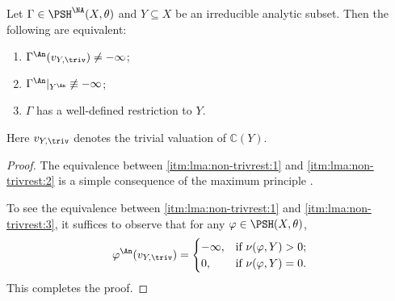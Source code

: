 \begin{lemma}\label{lma:non-trivrest}
    Let $\Gamma\in \PSH^{\NA}(X,\theta)$ and $Y\subseteq X$ be an irreducible analytic subset. Then the following are equivalent:
    \begin{enumerate}
    \item\label{itm:lma:non-trivrest:1} $\Gamma^{\An}(v_{Y,\triv})\neq -\infty$;
    \item\label{itm:lma:non-trivrest:2} $\Gamma^{\An}|_{Y^{\An}}\not\equiv -\infty$;
    \item\label{itm:lma:non-trivrest:3} $\Gamma$ has a well-defined restriction to $Y$.
\end{enumerate}
\end{lemma}
Here $v_{Y,\triv}$ denotes the trivial valuation of $\mathbb{C}(Y)$.

\begin{proof}
The equivalence between \ref{itm:lma:non-trivrest:1} and \ref{itm:lma:non-trivrest:2} is a simple consequence of the maximum principle \cite[Lemma~1.4(i)]{BJ22}.

To see the equivalence between \ref{itm:lma:non-trivrest:1} and \ref{itm:lma:non-trivrest:3}, it suffices to observe that for any $\varphi\in \PSH(X,\theta)$,
\[
\varphi^{\An}(v_{Y,\triv})=
\begin{cases}
    -\infty,&\textup{if }\nu(\varphi,Y)>0;\\
    0,& \textup{if }\nu(\varphi,Y)=0.
\end{cases}
\]
This completes the proof.
\end{proof}




%
